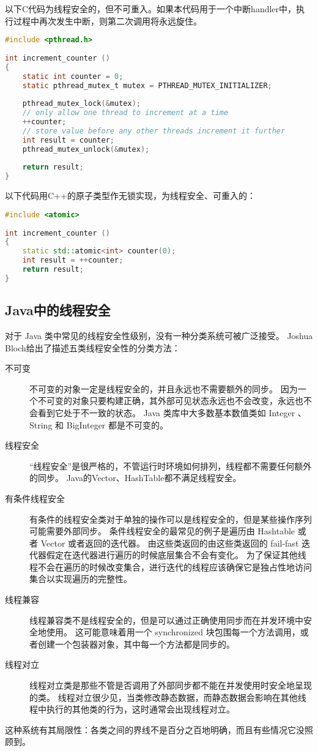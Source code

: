 以下C代码为线程安全的，但不可重入。如果本代码用于一个中断handler中，执行过程中再次发生中断，则第二次调用将永远旋住。
\begin{lstlisting}[language=C]    
#include <pthread.h>
 
int increment_counter ()
{
	static int counter = 0;
	static pthread_mutex_t mutex = PTHREAD_MUTEX_INITIALIZER;
 
	pthread_mutex_lock(&mutex); 
	// only allow one thread to increment at a time
	++counter;
	// store value before any other threads increment it further
	int result = counter; 
	pthread_mutex_unlock(&mutex);
 
	return result;
}
\end{lstlisting}

以下代码用C++的原子类型作无锁实现，为线程安全、可重入的：
\begin{lstlisting}[language=C++]    
#include <atomic>
 
int increment_counter ()
{
	static std::atomic<int> counter(0); 
	int result = ++counter; 
	return result;
}
\end{lstlisting}

 
 
 
 
 \subsection{Java中的线程安全}
对于 Java 类中常见的线程安全性级别，没有一种分类系统可被广泛接受。
Joshua Bloch给出了描述五类线程安全性的分类方法：
\begin{description}
\item[不可变]不可变的对象一定是线程安全的，并且永远也不需要额外的同步。
因为一个不可变的对象只要构建正确，其外部可见状态永远也不会改变，永远也不会看到它处于不一致的状态。
Java 类库中大多数基本数值类如 Integer 、 String 和 BigInteger 都是不可变的。
\item[线程安全]“线程安全”是很严格的，不管运行时环境如何排列，线程都不需要任何额外的同步。
Java的Vector、HashTable都不满足线程安全。
\item[有条件线程安全]有条件的线程安全类对于单独的操作可以是线程安全的，但是某些操作序列可能需要外部同步。
条件线程安全的最常见的例子是遍历由 Hashtable 或者 Vector 或者返回的迭代器。
由这些类返回的由这些类返回的 fail-fast 迭代器假定在迭代器进行遍历的时候底层集合不会有变化。
为了保证其他线程不会在遍历的时候改变集合，进行迭代的线程应该确保它是独占性地访问集合以实现遍历的完整性。
\item[线程兼容]线程兼容类不是线程安全的，但是可以通过正确使用同步而在并发环境中安全地使用。
这可能意味着用一个 synchronized 块包围每一个方法调用，或者创建一个包装器对象，其中每一个方法都是同步的。
\item[线程对立]线程对立类是那些不管是否调用了外部同步都不能在并发使用时安全地呈现的类。
线程对立很少见，当类修改静态数据，而静态数据会影响在其他线程中执行的其他类的行为，这时通常会出现线程对立。
\end{description}
这种系统有其局限性：各类之间的界线不是百分之百地明确，而且有些情况它没照顾到。 
 

